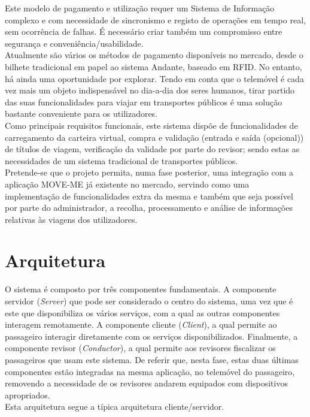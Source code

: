 Este modelo de pagamento e utilização requer um Sistema de Informação complexo e com necessidade de sincronismo e registo de operações em tempo real, sem ocorrência de falhas. É necessário criar também um compromisso entre segurança e conveniência/usabilidade.
\\Atualmente são vários os métodos de pagamento disponíveis no mercado, desde o bilhete tradicional em papel ao sistema Andante, baseado em RFID. No entanto, há ainda uma oportunidade por explorar. Tendo em conta que o telemóvel é cada vez mais um objeto indispensável no dia-a-dia dos seres humanos, tirar partido das suas funcionalidades para viajar em transportes públicos é uma solução bastante conveniente para os utilizadores.
\\Como principais requisitos funcionais, este sistema dispõe de funcionalidades de carregamento da carteira virtual, compra e validação (entrada e saída (opcional)) de títulos de viagem, verificação da validade por parte do revisor; sendo estas as necessidades de um sistema tradicional de transportes públicos.\cite{Buttyan2009}
\\Pretende-se que o projeto permita, numa fase posterior, uma integração com a aplicação MOVE-ME já existente no mercado, servindo como uma implementação de funcionalidades extra da mesma e também que seja possível por parte do administrador, a recolha, processamento e análise de informações relativas às viagens dos utilizadores.

\section{Arquitetura}

O sistema é composto por três componentes fundamentais. A componente servidor (\emph{Server}) que pode ser considerado o centro do sistema, uma vez que é este que disponibiliza os vários serviços, com a qual as outras componentes interagem remotamente. A componente cliente (\emph{Client}), a qual permite ao passageiro interagir diretamente com os serviços disponibilizados. Finalmente, a componente revisor (\emph{Conductor}), a qual permite aos revisores fiscalizar os passageiros que usam este sistema. De referir que, nesta fase, estas duas últimas componentes estão integradas na mesma aplicação, no telemóvel do passageiro, removendo a necessidade de os revisores andarem equipados com dispositivos apropriados.
\\Esta arquitetura segue a típica arquitetura cliente/servidor.

